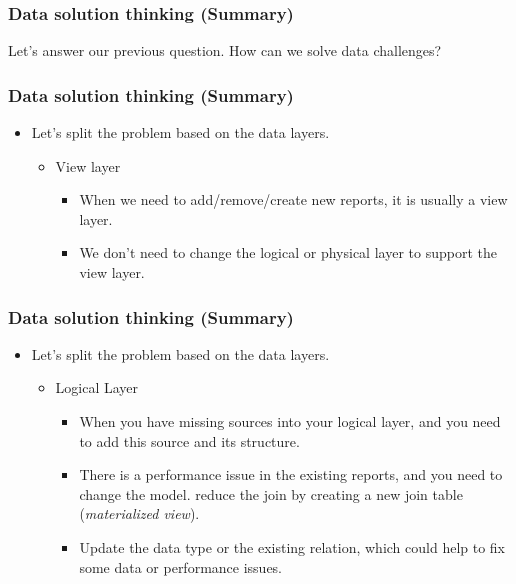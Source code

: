 \VideoClassification[column=2, colour=blue]
\begin{frame}[c]
    \frametitle{Data solution thinking (Summary) }
    \begin{center}
        Let's answer our previous question. How can we solve data challenges?
    \end{center}
\end{frame}


\begin{frame}
    \frametitle{Data solution thinking (Summary) }
    \begin{itemize}[<+->]
        \item Let's split the problem based on the data layers.
        \begin{itemize}[<+->]
            \item View layer
            \begin{itemize}[<+->]
                \item When we need to add/remove/create new reports, it is usually a view layer.
                \item We don't need to change the logical or physical layer to support the view layer.
            \end{itemize}
        \end{itemize}
    \end{itemize}
\end{frame}

\begin{frame}
    \frametitle{Data solution thinking (Summary) }
    \begin{itemize}[<+->]
        \item Let's split the problem based on the data layers.
        \begin{itemize}[<+->]
            \item Logical Layer
            \begin{itemize}[<+->]
                \item When you have missing sources into your logical layer, and you need to add this source and its structure.
                \item There is a performance issue in the existing reports, and you need to change the model. \forexample reduce the join by creating a new join table (\textit{materialized view}).
                \item Update the data type or the existing relation, which could help to fix some data or performance issues.
            \end{itemize}
        \end{itemize}
    \end{itemize}
\end{frame}

